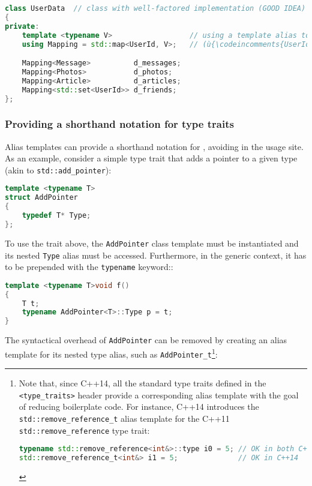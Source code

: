 \begin{lstlisting}[language=C++]
class UserData  // class with well-factored implementation (GOOD IDEA)
{
private:
    template <typename V>                  // using a template alias to bind
    using Mapping = std::map<UserId, V>;   // (ù{\codeincomments{UserId}}ù) as the key type

    Mapping<Message>          d_messages;
    Mapping<Photos>           d_photos;
    Mapping<Article>          d_articles;
    Mapping<std::set<UserId>> d_friends;
};
\end{lstlisting}


\subsubsection[Providing a shorthand notation for type traits]{Providing a shorthand notation for type traits}\label{providing-a-shorthand-notation-for-type-traits}

Alias templates can provide a shorthand notation for , avoiding  in the usage site. As an
example, consider a simple type trait that adds a pointer to a given
type (akin to \lstinline!std::add_pointer!):

\begin{lstlisting}[language=C++]
template <typename T>
struct AddPointer
{
    typedef T* Type;
};
\end{lstlisting}

\noindent To use the trait above, the \lstinline!AddPointer! class template must be instantiated and its nested
\lstinline!Type! alias must be accessed. Furthermore, in the generic context, it has to be prepended with the \lstinline!typename! keyword::

\begin{lstlisting}[language=C++]
template <typename T>void f()
{
    T t;
    typename AddPointer<T>::Type p = t;
}
\end{lstlisting}

\noindent The syntactical overhead of \lstinline!AddPointer! can be removed by
creating an alias template for its nested type alias, such as
\lstinline!AddPointer_t!{\cprotect\footnote{Note that, since C++14, all
the standard type traits defined in the \lstinline!<type_traits>! header
provide a corresponding alias template with the goal of reducing
boilerplate code. For instance, C++14 introduces the
\lstinline!std::remove_reference_t! alias template for the C++11
\lstinline!std::remove_reference! type trait:

\begin{lstlisting}[language=C++, basicstyle={\ttfamily\footnotesize}]
typename std::remove_reference<int&>::type i0 = 5; // OK in both C++11 and C++14
std::remove_reference_t<int&> i1 = 5;              // OK in C++14
\end{lstlisting}
      }}:

